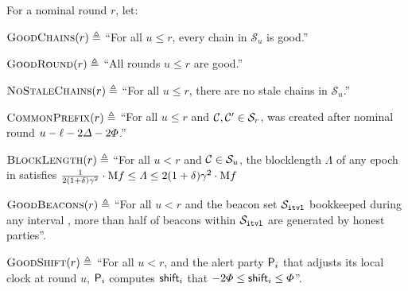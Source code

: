 \begin{definition} \label{def:analysis-predicate}
    For a nominal round $r$, let:
    \begin{cccItemize}[nosep]
        \item $\textsc{GoodChains}(r) \triangleq$ ``For all $u \le r$, every chain in $\mathcal{S}_u$ is good.''

        \item $\textsc{GoodRound}(r) \triangleq$ ``All rounds $u \le r$ are good.''

        \item $\textsc{NoStaleChains}(r) \triangleq$ ``For all $u \le r$, there are no stale chains in $\mathcal{S}_u$.''

        \item $\textsc{CommonPrefix}(r) \triangleq$ ``For all $u \le r$ and $\mathcal{C}, \mathcal{C}' \in \mathcal{S}_r$,  was created after nominal round $u - \ell - 2\varDelta - 2\varPhi$.''

        \item $\textsc{BlockLength}(r) \triangleq$ ``For all $u < r$ and $\mathcal{C} \in \mathcal{S}_u$, the blocklength $\varLambda$ of any epoch \epoch in \chain satisfies $\frac{1}{2(1 + \delta)\gamma^2} \cdot \mathrm{M} f \le \varLambda \le 2(1 + \delta)\gamma^2 \cdot \mathrm{M} f$

        \item $\textsc{GoodBeacons}(r) \triangleq$ ``For all $u < r$ and the beacon set $\mathcal{S}_{\mathtt{itvl}}$ bookkeeped during any interval \interval, more than half of beacons within $\mathcal{S}_{\mathtt{itvl}}$ are generated by honest parties''.

        \item $\textsc{GoodShift}(r) \triangleq$ ``For all $u < r$, and the alert party $\mathsf{P}_i$ that adjusts its local clock at round $u$, $\mathsf{P}_i$ computes $\mathsf{shift}_i$ that $-2\varPhi \le \mathsf{shift}_i \le \varPhi$''.


\end{cccItemize}
\end{definition}
